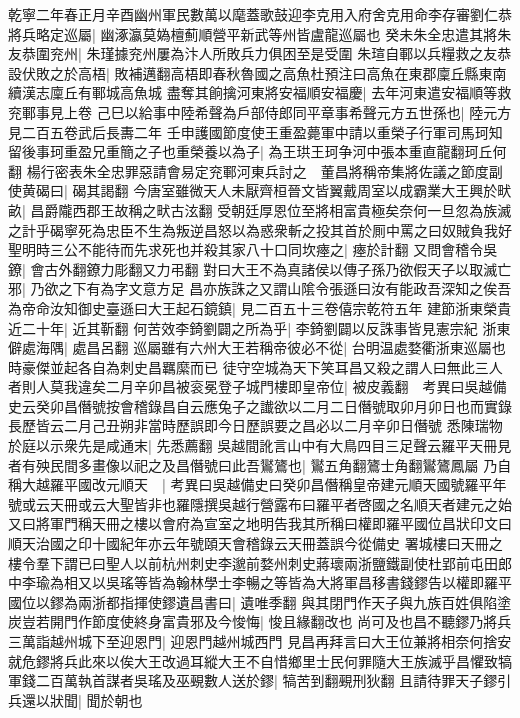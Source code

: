 乾寧二年春正月辛酉幽州軍民數萬以麾蓋歌鼓迎李克用入府舍克用命李存審劉仁恭將兵略定巡屬|{
	幽涿瀛莫媯檀薊順營平新武等州皆盧龍巡屬也}
癸未朱全忠遣其將朱友恭圍兖州|{
	朱瑾據兖州屢為汴人所敗兵力俱困至是受圍}
朱瑄自鄆以兵糧救之友恭設伏敗之於高梧|{
	敗補邁翻高梧即春秋魯國之高魚杜預注曰高魚在東郡廩丘縣東南續漢志廩丘有鄆城高魚城}
盡奪其餉擒河東將安福順安福慶|{
	去年河東遣安福順等救兖鄆事見上卷}
己巳以給事中陸希聲為戶部侍郎同平章事希聲元方五世孫也|{
	陸元方見二百五卷武后長夀二年}
壬申護國節度使王重盈薨軍中請以重榮子行軍司馬珂知留後事珂重盈兄重簡之子也重榮養以為子|{
	為王珙王珂争河中張本重直龍翻珂丘何翻}
楊行密表朱全忠罪惡請會易定兖鄆河東兵討之　董昌將稱帝集將佐議之節度副使黄碣曰|{
	碣其謁翻}
今唐室雖微天人未厭齊桓晉文皆翼戴周室以成霸業大王興於畎畝|{
	昌爵隴西郡王故稱之畎古泫翻}
受朝廷厚恩位至將相富貴極矣奈何一旦忽為族滅之計乎碣寧死為忠臣不生為叛逆昌怒以為惑衆斬之投其首於厠中罵之曰奴賊負我好聖明時三公不能待而先求死也并殺其家八十口同坎瘞之|{
	瘞於計翻}
又問會稽令吳鐐|{
	會古外翻鐐力彫翻又力弔翻}
對曰大王不為真諸侯以傳子孫乃欲假天子以取滅亡邪|{
	乃欲之下有為字文意方足}
昌亦族誅之又謂山隂令張遜曰汝有能政吾深知之俟吾為帝命汝知御史臺遜曰大王起石鏡鎮|{
	見二百五十三卷僖宗乾符五年}
建節浙東榮貴近二十年|{
	近其靳翻}
何苦效李錡劉闢之所為乎|{
	李錡劉闢以反誅事皆見憲宗紀}
浙東僻處海隅|{
	處昌呂翻}
巡屬雖有六州大王若稱帝彼必不從|{
	台明温處婺衢浙東巡屬也時豪傑並起各自為刺史昌羈縻而已}
徒守空城為天下笑耳昌又殺之謂人曰無此三人者則人莫我違矣二月辛卯昌被衮冕登子城門樓即皇帝位|{
	被皮義翻　考異曰吳越備史云癸卯昌僭號按會稽錄昌自云應兔子之䜟欲以二月二日僭號取卯月卯日也而實錄長歷皆云二月己丑朔非當時歷誤即今日歷誤要之昌必以二月辛卯日僭號}
悉陳瑞物於庭以示衆先是咸通末|{
	先悉薦翻}
吳越間訛言山中有大鳥四目三足聲云羅平天冊見者有殃民間多畫像以祀之及昌僭號曰此吾鸑鷟也|{
	鸑五角翻鷟士角翻鸑鷟鳳屬}
乃自稱大越羅平國改元順天　|{
	考異曰吳越備史曰癸卯昌僭稱皇帝建元順天國號羅平年號或云天冊或云大聖皆非也羅隱撰吳越行營露布曰羅平者啓國之名順天者建元之始又曰將軍門稱天冊之樓以會府為宣室之地明告我其所稱曰權即羅平國位昌狀印文曰順天治國之印十國紀年亦云年號頤天會稽錄云天冊蓋誤今從備史}
署城樓曰天冊之樓令羣下謂已曰聖人以前杭州刺史李邈前婺州刺史蔣瓌兩浙鹽鐵副使杜郢前屯田郎中李瑜為相又以吳瑤等皆為翰林學士李暢之等皆為大將軍昌移書錢鏐告以權即羅平國位以鏐為兩浙都指揮使鏐遺昌書曰|{
	遺唯季翻}
與其閉門作天子與九族百姓俱陷塗炭豈若開門作節度使終身富貴邪及今悛悔|{
	悛且緣翻改也}
尚可及也昌不聽鏐乃將兵三萬詣越州城下至迎恩門|{
	迎恩門越州城西門}
見昌再拜言曰大王位兼將相奈何捨安就危鏐將兵此來以俟大王改過耳縱大王不自惜鄉里士民何罪隨大王族滅乎昌懼致犒軍錢二百萬執首謀者吳瑤及巫覡數人送於鏐|{
	犒苦到翻覡刑狄翻}
且請待罪天子鏐引兵還以狀聞|{
	聞於朝也}
